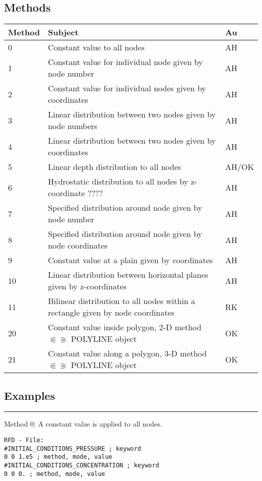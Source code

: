 \subsection{Methods}
\begin{table}[h]
\begin{tabular}{|l|l|l|}
\hline Method & Subject & Au
\\
\hline \hline
0 & Constant value to all nodes & AH
\\
1 & Constant value for individual node given by node number & AH
\\
2 & Constant value for individual nodes given by coordinates & AH
\\
3 & Linear distribution between two nodes given by node numbers & AH
\\
4 & Linear distribution between two nodes given by coordinates & AH
\\
5 & Linear depth distribution to all nodes & AH/OK
\\
6 & Hydrostatic distribution to all nodes by z-coordinate ???? & AH
\\
7 & Specified distribution around node given by node number & AH
\\
8 & Specified distribution around node given by node coordinates & AH
\\
9 & Constant value at a plain given by coordinates & AH
\\
10 & Linear distribution between horizontal planes given by z-coordinates & AH
\\
11 & Bilinear distribution to all nodes within a rectangle given by node coordinates & RK
\\
20 & Constant value inside polygon, 2-D method $\Subset\Supset$ POLYLINE object & OK
\\
21 & Constant value along a polygon, 3-D method $\Subset\Supset$ POLYLINE object & OK
\\
\hline
\end{tabular}
\end{table}
\newpage
\subsection{Examples}
\hrule
Method 0:
A constant value is applied to all nodes.
%
\small
\begin{verbatim}
RFD - File:
#INITIAL_CONDITIONS_PRESSURE ; keyword
0 0 1.e5 ; method, mode, value
#INITIAL_CONDITIONS_CONCENTRATION ; keyword
0 0 0. ; method, mode, value
\end{verbatim}
\normalsize

